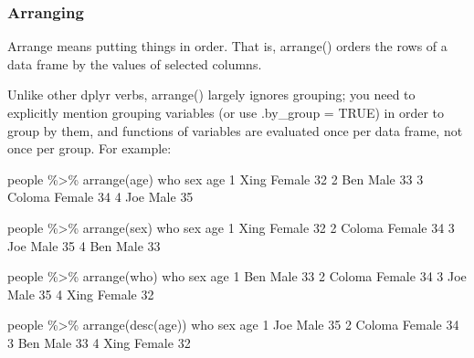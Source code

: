 \documentclass[
]{book}
\newenvironment{Shaded}{\begin{snugshade}}{\end{snugshade}}
\newcommand{\DecValTok}[1]{\textcolor[rgb]{0.00,0.00,0.81}{#1}}
\newcommand{\FunctionTok}[1]{\textcolor[rgb]{0.00,0.00,0.00}{#1}}
\newcommand{\NormalTok}[1]{#1}
\newcommand{\SpecialCharTok}[1]{\textcolor[rgb]{0.00,0.00,0.00}{#1}}
\begin{document}
\hypertarget{arranging}{%
\subsubsection*{Arranging}\label{arranging}}

Arrange means putting things in order. That is, arrange() orders the rows of a data frame by the values of selected columns.

Unlike other dplyr verbs, arrange() largely ignores grouping; you need to explicitly mention grouping variables (or use .by\_group = TRUE) in order to group by them, and functions of variables are evaluated once per data frame, not once per group. For example:

\begin{Shaded}
\begin{Highlighting}[]
\NormalTok{people }\SpecialCharTok{\%\textgreater{}\%} \FunctionTok{arrange}\NormalTok{(age)}
\NormalTok{     who    sex age}
\DecValTok{1}\NormalTok{   Xing Female  }\DecValTok{32}
\DecValTok{2}\NormalTok{    Ben   Male  }\DecValTok{33}
\DecValTok{3}\NormalTok{ Coloma Female  }\DecValTok{34}
\DecValTok{4}\NormalTok{    Joe   Male  }\DecValTok{35}

\NormalTok{people }\SpecialCharTok{\%\textgreater{}\%} \FunctionTok{arrange}\NormalTok{(sex)}
\NormalTok{     who    sex age}
\DecValTok{1}\NormalTok{   Xing Female  }\DecValTok{32}
\DecValTok{2}\NormalTok{ Coloma Female  }\DecValTok{34}
\DecValTok{3}\NormalTok{    Joe   Male  }\DecValTok{35}
\DecValTok{4}\NormalTok{    Ben   Male  }\DecValTok{33}

\NormalTok{people }\SpecialCharTok{\%\textgreater{}\%} \FunctionTok{arrange}\NormalTok{(who)}
\NormalTok{     who    sex age}
\DecValTok{1}\NormalTok{    Ben   Male  }\DecValTok{33}
\DecValTok{2}\NormalTok{ Coloma Female  }\DecValTok{34}
\DecValTok{3}\NormalTok{    Joe   Male  }\DecValTok{35}
\DecValTok{4}\NormalTok{   Xing Female  }\DecValTok{32}

\NormalTok{people }\SpecialCharTok{\%\textgreater{}\%} \FunctionTok{arrange}\NormalTok{(}\FunctionTok{desc}\NormalTok{(age))}
\NormalTok{     who    sex age}
\DecValTok{1}\NormalTok{    Joe   Male  }\DecValTok{35}
\DecValTok{2}\NormalTok{ Coloma Female  }\DecValTok{34}
\DecValTok{3}\NormalTok{    Ben   Male  }\DecValTok{33}
\DecValTok{4}\NormalTok{   Xing Female  }\DecValTok{32}
\end{Highlighting}
\end{Shaded}
\end{document}
